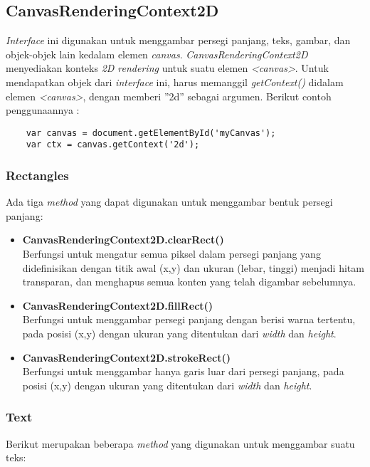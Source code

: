 \subsection{CanvasRenderingContext2D}
\textit{Interface} ini digunakan untuk menggambar persegi panjang, teks, gambar, dan objek-objek lain kedalam elemen \textit{canvas}. \textit{CanvasRenderingContext2D} menyediakan konteks \textit{2D rendering} untuk suatu elemen \textit{<canvas>}.
Untuk mendapatkan objek dari \textit{interface} ini, harus memanggil \textit{getContext()} didalam elemen \textit{<canvas>}, dengan memberi ''2d'' sebagai argumen. Berikut contoh penggunaannya :

\begin{lstlisting}
	var canvas = document.getElementById('myCanvas');
	var ctx = canvas.getContext('2d');
\end{lstlisting}

\subsubsection{Rectangles}
Ada tiga \textit{method} yang dapat digunakan untuk menggambar bentuk persegi panjang:

\begin{itemize}
	\item \textbf{CanvasRenderingContext2D.clearRect()} \\ Berfungsi untuk mengatur semua piksel dalam persegi panjang yang didefinisikan dengan titik awal (x,y) dan ukuran (lebar, tinggi) menjadi hitam transparan, dan menghapus semua konten yang telah digambar sebelumnya.
	\item \textbf{CanvasRenderingContext2D.fillRect()} \\ Berfungsi untuk menggambar persegi panjang dengan berisi warna tertentu, pada posisi (x,y) dengan ukuran yang ditentukan dari \textit{width} dan \textit{height}.
	\item \textbf{CanvasRenderingContext2D.strokeRect()} \\ Berfungsi untuk menggambar hanya garis luar dari persegi panjang, pada posisi (x,y) dengan ukuran yang ditentukan dari \textit{width} dan \textit{height}.
\end{itemize}

\subsubsection{Text}
Berikut merupakan beberapa \textit{method} yang digunakan untuk menggambar suatu teks:

